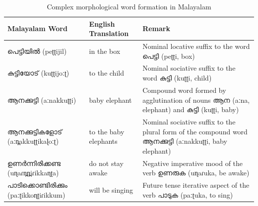 \begin{table}[ht]

	\caption{Complex morphological word formation in Malayalam }
	\label{tab:morph-ml}

	\centering
	\begin{tabular}{p{4cm}p{3.5cm}p{4.7cm}}
		\hline \hline \bf Malayalam Word            & \bf English Translation  & \bf Remark                                                                                                           \\ \hline
		{\mal പെട്ടിയില്‍} ({\ipa  peʈʈijil})‍             & in the box                 & Nominal locative suffix to the word {\mal പെട്ടി‍} ({\ipa peʈʈi, box})‍                                                   \\

		{\mal കുട്ടിയോട്} ({\ipa kuʈʈijoːʈ})‍             & to the child               & Nominal sociative suffix
		to the word {\mal കുട്ടി} ({\ipa kuʈʈi, child})‍                                                                                                                                                    \\

		{\mal ആനക്കുട്ടി} ({\ipa aːnakkuʈʈi})‍           & baby elephant              & Compound word formed by agglutination of nouns {\mal ആന} ({\ipa aːna, elephant}) and {\mal കുട്ടി} ({\ipa kuʈʈi, baby}) \\

		{\mal ആനക്കുട്ടികളോട്‍} ({\ipa aːn̪akkuʈʈikaɭoːʈ})‍  & to the baby elephants      & Nominal sociative suffix to the plural form of the compound word {\mal ആനക്കുട്ടി} ({\ipa aːnakkuʈʈi, baby elephant})    \\

		{\mal ഉണര്‍ന്നിരിക്കണ്ട‍} ({\ipa uɳaɾn̪n̪iɾikkaɳʈa})‍  & do not stay awake          & Negative imperative mood of the verb {\mal ഉണരുക} ({\ipa uɳaɾuka, be awake})                                          \\

		{\mal പാടിക്കൊണ്ടിരിക്കും} ({\ipa paːʈikkoɳʈiɾikkum})‍ & will be singing            & Future tense iterative aspect of the verb {\mal പാടുക} ({\ipa paːʈuka, to sing})                                       \\

		\hline
	\end{tabular}

\end{table}

